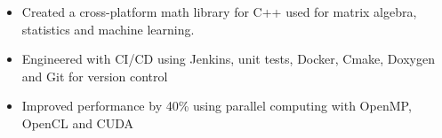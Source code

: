 \documentclass[11pt,a4paper,ragged2e]{altacv}
\begin{document}
\begin{paracol}{1}

\begin{itemize}
\item Created a cross-platform math library for C++ used for matrix algebra, statistics and machine learning.
\item Engineered with CI/CD using Jenkins, unit tests, Docker, Cmake, Doxygen and Git for version control
\item Improved performance by 40\% using parallel computing with OpenMP, OpenCL and CUDA
\end{itemize}

\tightdivider








\end{paracol}
\end{document}
